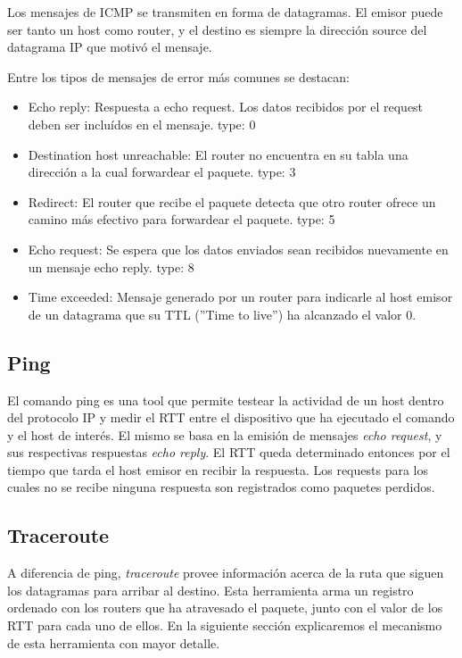 Los mensajes de ICMP se transmiten en forma de datagramas. El emisor puede ser tanto un host como router,
y el destino es siempre la direcci\'on source del datagrama IP que motiv\'o el mensaje.

Entre los tipos de mensajes de error m\'as comunes se destacan:
\begin{itemize}
  \item Echo reply: Respuesta a echo request. Los datos recibidos por el request deben ser inclu\'idos
  en el mensaje. type: 0
  \item Destination host unreachable: El router no encuentra en su tabla una direcci\'on a la cual
  forwardear el paquete. type: 3
  \item Redirect: El router que recibe el paquete detecta que otro router ofrece un camino m\'as
  efectivo para forwardear el paquete. type: 5
  \item Echo request: Se espera que los datos enviados sean recibidos nuevamente en un mensaje echo
  reply. type: 8
  \item Time exceeded: Mensaje generado por un router para indicarle al host emisor de un datagrama
  que su TTL (''Time to live'') ha alcanzado el valor 0.

\end{itemize}


\subsection{Ping}

El comando ping es una tool que permite testear la actividad de un host dentro del protocolo IP y medir
el RTT entre el dispositivo que ha ejecutado el comando y el host de inter\'es. El mismo se basa en
la emisi\'on de mensajes \emph{echo request}, y sus respectivas respuestas \emph{echo reply}. El RTT queda
determinado entonces por el tiempo que tarda el host emisor en recibir la respuesta.
Los requests para los cuales no se recibe ninguna respuesta son registrados como paquetes perdidos.

\subsection{Traceroute}

A diferencia de ping, \emph{traceroute} provee informaci\'on acerca de la ruta que siguen los datagramas
para arribar al destino. Esta herramienta arma un registro ordenado con los routers que ha atravesado
el paquete, junto con el valor de los RTT para cada uno de ellos.
En la siguiente secci\'on explicaremos el
mecanismo de esta herramienta con mayor detalle.
